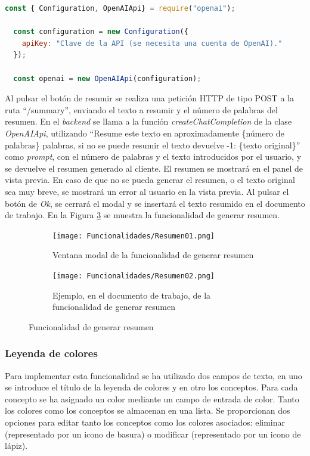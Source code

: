\begin{lstlisting}[label=fig:impresumenconfiguracion, caption=Configuración de la clase \textit{OpenAIApi}., language=JavaScript]
  const { Configuration, OpenAIApi} = require("openai");

  const configuration = new Configuration({
    apiKey: "Clave de la API (se necesita una cuenta de OpenAI)."
  });

  const openai = new OpenAIApi(configuration);
\end{lstlisting}

Al pulsar el botón de resumir se realiza una petición HTTP de tipo POST a la ruta ``/summary'', enviando el texto a resumir y el número de palabras del resumen. En el \textit{backend} se llama a la función \textit{createChatCompletion} de la clase \textit{OpenAIApi}, utilizando ``Resume este texto en aproximadamente \{número de palabras\} palabras, si no se puede resumir el texto devuelve -1: \{texto original\}'' como \textit{prompt}, con el número de palabras y el texto introducidos por el usuario, y se devuelve el resumen generado al cliente. El resumen se mostrará en el panel de vista previa. En caso de que no se pueda generar el resumen, o el texto original sea muy breve, se mostrará un error al usuario en la vista previa. Al pulsar el botón de \textit{Ok}, se cerrará el modal y se insertará el texto resumido en el documento de trabajo. En la Figura \ref{fig:impresumen} se muestra la funcionalidad de generar resumen.

\begin{figure}[ht!]
  \centering
  \begin{subfigure}{\textwidth}
    \centering
    \texttt{[image: Funcionalidades/Resumen01.png]}
    \caption{Ventana modal de la funcionalidad de generar resumen}
    \label{fig:impresumen01}
  \end{subfigure}

  \begin{subfigure}{\textwidth}
    \centering
    \texttt{[image: Funcionalidades/Resumen02.png]}
    \caption{Ejemplo, en el documento de trabajo, de la funcionalidad de generar resumen}
    \label{fig:impresumen02}
  \end{subfigure}

  \caption{Funcionalidad de generar resumen}
  \label{fig:impresumen}
\end{figure}

\subsubsection{Leyenda de colores}
\label{sec:leyendaColores}
Para implementar esta funcionalidad se ha utilizado dos campos de texto, en uno se introduce el título de la leyenda de colores y en otro los conceptos. Para cada concepto se ha asignado un color mediante un campo de entrada de color. Tanto los colores como los conceptos se almacenan en una lista. Se proporcionan dos opciones para editar tanto los conceptos como los colores asociados: eliminar (representado por un icono de basura) o modificar (representado por un icono de lápiz).


